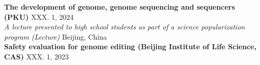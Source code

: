 \textbf{The development of genome, genome sequencing and sequencers (PKU)} \hfill XXX. 1, 2024 \\
\textit{A lecture presented to high school students as part of a science popularization program (Lecture)} \hfill Beijing, China \\
\textbf{Safety evaluation for genome editing (Beijing Institute of Life Science, CAS)} \hfill XXX. 1, 2023 \\



